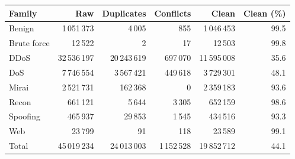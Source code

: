 \begin{tabular}{lrrrrr}
\toprule
Family & Raw & Duplicates & Conflicts & Clean & Clean (\%) \\
\midrule
Benign & 1\,051\,373 & 4\,005 & 855 & 1\,046\,453 & 99.5 \\
Brute force & 12\,522 & 2 & 17 & 12\,503 & 99.8 \\
DDoS & 32\,536\,197 & 20\,243\,619 & 697\,070 & 11\,595\,008 & 35.6 \\
DoS & 7\,746\,554 & 3\,567\,421 & 449\,618 & 3\,729\,301 & 48.1 \\
Mirai & 2\,521\,731 & 162\,368 & 0 & 2\,359\,183 & 93.6 \\
Recon & 661\,121 & 5\,644 & 3\,305 & 652\,159 & 98.6 \\
Spoofing & 465\,937 & 29\,853 & 1\,545 & 434\,516 & 93.3 \\
Web & 23\,799 & 91 & 118 & 23\,589 & 99.1 \\
\midrule
Total & 45\,019\,234 & 24\,013\,003 & 1\,152\,528 & 19\,852\,712 & 44.1 \\
\bottomrule
\end{tabular}
